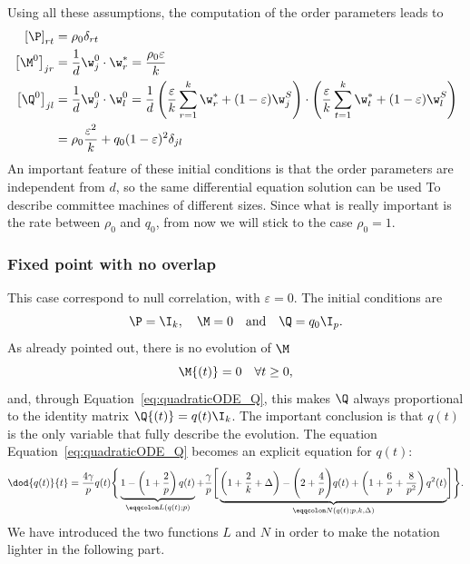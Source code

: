 Using all these assumptions, the computation of the order parameters leads to
\begin{align*}
  \left[\P\right]_{rt} &= \rho_0\delta_{rt}\\
  \left[\M^0\right]_{jr} &= \frac1d \w_j^0 \cdot \w^*_r = \frac{\rho_0\varepsilon}{k} \\
  \left[\Q^0\right]_{jl} &= \frac1d \w_j^0 \cdot \w^0_l = \frac1d
    \left(\frac{\varepsilon}{k} \sum_{r=1}^k \w^*_r + (1-\varepsilon) \w_j^S\right)\cdot
    \left(\frac{\varepsilon}{k} \sum_{t=1}^k \w^*_t + (1-\varepsilon) \w_l^S\right)\\
      &= \rho_0\frac{\varepsilon^2}{k} + q_0(1-\varepsilon)^2 \delta_{jl}
\end{align*}
An important feature of these initial conditions is that the order parameters are 
independent from \(d\), so the same differential equation solution can be used To
describe committee machines of different sizes.
Since what is really important is the rate between \(\rho_0\) and \(q_0\),
from now we will stick to the case \(\rho_0 = 1\).

\subsubsection{Fixed point with no overlap}
This case correspond to null correlation, with \(\varepsilon=0\).
The initial conditions are 
\[\P = \I_k, \quad \M = 0 \quad \text{and}\quad \Q = q_0 \I_p.\]
As already pointed out, there is no evolution of \(\M\)
\[\M{(t)} = 0\quad \forall t\ge0,\]
and, through Equation~\eqref{eq:quadraticODE_Q},
this makes \(\Q\) always proportional to the identity matrix \(\Q{(t)} = q{(t)} \I_k\).
The important conclusion is that \(q(t)\) is the only variable that fully describe the evolution.
The equation Equation~\eqref{eq:quadraticODE_Q} becomes an explicit equation for \(q{(t)}\):
\begin{equation}\label{eq:eps0ODEforq}\begin{split}
    \dod{q{(t)}}{t} = \frac{4\gamma}{p}q{(t)}\Biggr\{\underbrace{
        1 - \left(1+\frac2p\right) q{(t)}}_{\eqqcolon L{(q{(t)};p)}}
    +\frac{\gamma}{p} \Biggr[\underbrace{
        \left(1+\frac2k+\Delta\right) - \Biggl(2 + \frac4p \Biggl)q{(t)} +
        \left(1+\frac6p+\frac{8}{p^2}\right)q^2{(t)}}_{\eqqcolon N{(q{(t)};p,k,\Delta)}}
    \Biggr]\Biggr\}.
\end{split}\end{equation}
We have introduced the two functions \(L\) and \(N\) in order to make the notation
lighter in the following part.

